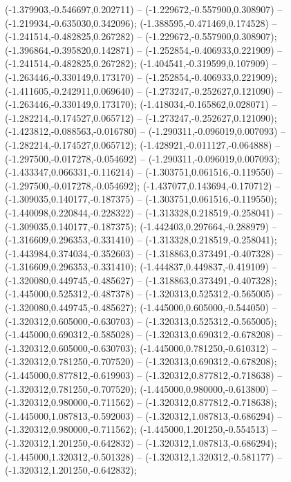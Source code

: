 (-1.379903,-0.546697,0.202711) -- (-1.229672,-0.557900,0.308907) -- (-1.219934,-0.635030,0.342096);
 (-1.388595,-0.471469,0.174528) -- (-1.241514,-0.482825,0.267282) -- (-1.229672,-0.557900,0.308907);
 (-1.396864,-0.395820,0.142871) -- (-1.252854,-0.406933,0.221909) -- (-1.241514,-0.482825,0.267282);
 (-1.404541,-0.319599,0.107909) -- (-1.263446,-0.330149,0.173170) -- (-1.252854,-0.406933,0.221909);
 (-1.411605,-0.242911,0.069640) -- (-1.273247,-0.252627,0.121090) -- (-1.263446,-0.330149,0.173170);
 (-1.418034,-0.165862,0.028071) -- (-1.282214,-0.174527,0.065712) -- (-1.273247,-0.252627,0.121090);
 (-1.423812,-0.088563,-0.016780) -- (-1.290311,-0.096019,0.007093) -- (-1.282214,-0.174527,0.065712);
 (-1.428921,-0.011127,-0.064888) -- (-1.297500,-0.017278,-0.054692) -- (-1.290311,-0.096019,0.007093);
 (-1.433347,0.066331,-0.116214) -- (-1.303751,0.061516,-0.119550) -- (-1.297500,-0.017278,-0.054692);
 (-1.437077,0.143694,-0.170712) -- (-1.309035,0.140177,-0.187375) -- (-1.303751,0.061516,-0.119550);
 (-1.440098,0.220844,-0.228322) -- (-1.313328,0.218519,-0.258041) -- (-1.309035,0.140177,-0.187375);
 (-1.442403,0.297664,-0.288979) -- (-1.316609,0.296353,-0.331410) -- (-1.313328,0.218519,-0.258041);
 (-1.443984,0.374034,-0.352603) -- (-1.318863,0.373491,-0.407328) -- (-1.316609,0.296353,-0.331410);
 (-1.444837,0.449837,-0.419109) -- (-1.320080,0.449745,-0.485627) -- (-1.318863,0.373491,-0.407328);
 (-1.445000,0.525312,-0.487378) -- (-1.320313,0.525312,-0.565005) -- (-1.320080,0.449745,-0.485627);
 (-1.445000,0.605000,-0.544050) -- (-1.320312,0.605000,-0.630703) -- (-1.320313,0.525312,-0.565005);
 (-1.445000,0.690312,-0.585028) -- (-1.320313,0.690312,-0.678208) -- (-1.320312,0.605000,-0.630703);
 (-1.445000,0.781250,-0.610312) -- (-1.320312,0.781250,-0.707520) -- (-1.320313,0.690312,-0.678208);
 (-1.445000,0.877812,-0.619903) -- (-1.320312,0.877812,-0.718638) -- (-1.320312,0.781250,-0.707520);
 (-1.445000,0.980000,-0.613800) -- (-1.320312,0.980000,-0.711562) -- (-1.320312,0.877812,-0.718638);
 (-1.445000,1.087813,-0.592003) -- (-1.320312,1.087813,-0.686294) -- (-1.320312,0.980000,-0.711562);
 (-1.445000,1.201250,-0.554513) -- (-1.320312,1.201250,-0.642832) -- (-1.320312,1.087813,-0.686294);
 (-1.445000,1.320312,-0.501328) -- (-1.320312,1.320312,-0.581177) -- (-1.320312,1.201250,-0.642832);

